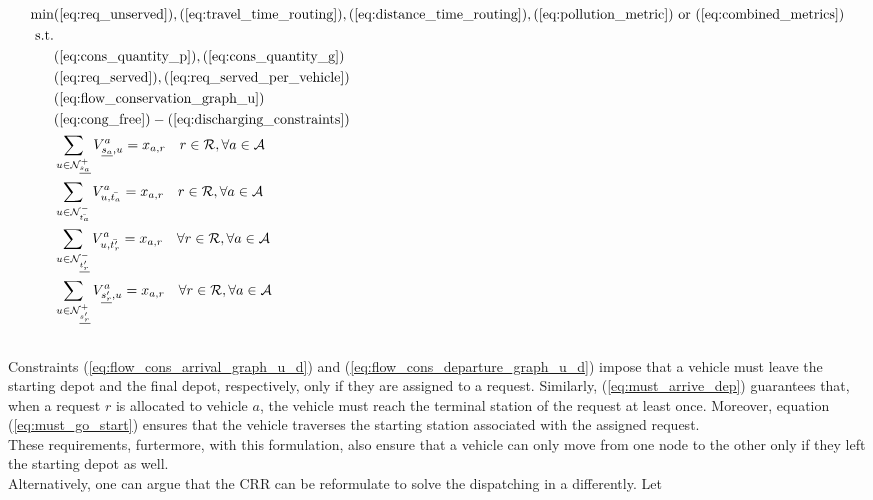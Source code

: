 \begin{align}
	\text{min}&  
		(\ref{eq:req_unserved}),
		(\ref{eq:travel_time_routing}), (\ref{eq:distance_time_routing}), (\ref{eq:pollution_metric}) \text{ or } (\ref{eq:combined_metrics})
	\nonumber\\
	\text{s.t.} &\nonumber\\
	&(\ref{eq:cons_quantity_p}),(\ref{eq:cons_quantity_g})\nonumber\\	
	&(\ref{eq:req_served}),(\ref{eq:req_served_per_vehicle})\nonumber\\	
	&(\ref{eq:flow_conservation_graph_u})\nonumber\\%
	&(\ref{eq:cong_free})-(\ref{eq:discharging_constraints})\nonumber\\
	&\sum_{ u \in \mathcal{N}^+_{\underline{s_a}} }V^a_{ \underline{s_a},u} = x_{a,r} \quad r \in \mathcal{R},  \forall a \in \mathcal{A} \label{eq:flow_cons_arrival_graph_u_d}\\
	&\sum_{u \in \mathcal{N}^-_{\bar{t_a}} } V^a_{u, \bar{t_a}} = x_{a,r} \quad r \in \mathcal{R},  \forall a \in \mathcal{A} \label{eq:flow_cons_departure_graph_u_d}\\
	&\sum_{u \in \mathcal{N}^-_{\underline{t'_r}} } V^a_{u, \bar{t'_r}} = x_{a,r} \quad  \forall r \in \mathcal{R}, \forall a \in \mathcal{A} \label{eq:must_arrive_dep}	\\
	&\sum_{u \in \mathcal{N}^+_{\underline{s'_r}} } V^a_{ \underline{s'_r}, u} = x_{a,r} \quad   \forall r \in \mathcal{R}, \forall a \in \mathcal{A}\label{eq:must_go_start}\\
	\nonumber
\end{align}
Constraints (\ref{eq:flow_cons_arrival_graph_u_d}) and (\ref{eq:flow_cons_departure_graph_u_d}) impose that a vehicle must leave the starting depot and the final depot, respectively, only if they are assigned to a request. 
Similarly, (\ref{eq:must_arrive_dep}) guarantees that, when a request $r$ is allocated to vehicle $a$, the vehicle must reach the terminal station of the request at least once. Moreover, equation (\ref{eq:must_go_start}) ensures that the vehicle traverses the starting station associated with the assigned request. \\
These requirements, furtermore, with this formulation, also ensure that a vehicle can only move from one node to the other only if they left the starting depot as well. \\ 
Alternatively, one can argue that the CRR can be reformulate to solve the dispatching in a differently. Let 

